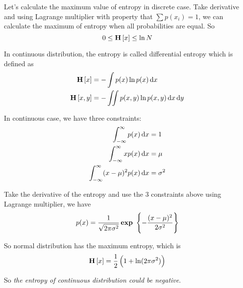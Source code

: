 \begin{theorem}
    Let's calculate the maximum value of entropy in discrete case. Take derivative and using Lagrange multiplier with property that $\sum p(x_i) = 1$, we can calculate the maximum of entropy when all probabilities are equal. So
    \begin{equation}
        0 \leq \mathop{\bf H\/}\left[\displaystyle x \right] \leq \ln N
    \end{equation}
\end{theorem}



\begin{definition}
    In continuous distribution, the entropy is called differential entropy which is defined as
    \begin{equation}
        \begin{aligned}
            \entropy{x} &= - \int p(x) \ln p(x) \dif x \\
            \entropy{x,y} &= - \iint p(x,y) \ln p(x,y) \dif x \dif y
        \end{aligned}
    \end{equation}
\end{definition}


\begin{theorem}
    In continuous case, we have three constraints:
    \begin{equation}
        \begin{aligned}
            \int_{-\infty}^{\infty} p(x) \dif x &= 1 \\
            \int_{-\infty}^{\infty} x p(x) \dif x &= \mu \\
            \int_{-\infty}^{\infty} (x-\mu)^2 p(x) \dif x &= \sigma^2 \\
        \end{aligned}
    \end{equation}
    
    Take the derivative of the entropy and use the 3 constraints above using Lagrange multiplier,  we have
    \begin{equation}
        p(x) = \frac{1}{\sqrt{2\pi \sigma^2}} \mathop{\bf exp\/}~\set{- \frac{(x-\mu)^2}{2 \sigma^2}}
    \end{equation}
    
    So normal distribution has the maximum entropy, which is 
    \begin{equation}
        \mathop{\bf H\/}\left[\displaystyle x \right] = \frac{1}{2} \left(1 + \ln (2\pi \sigma^2) \right)
    \end{equation}
    
    So \emph{the entropy of continuous distribution could be negative}.
\end{theorem}


